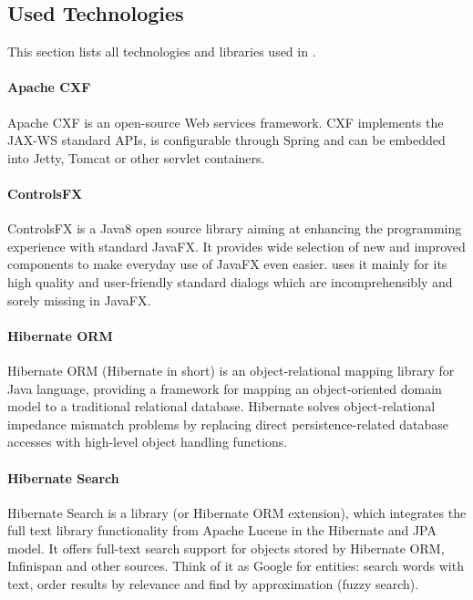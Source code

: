 
\subsection{Used Technologies}

This section lists all technologies and libraries used in \textan{}.

\paragraph{Apache CXF}
Apache CXF is an open-source Web services framework. CXF implements the JAX-WS 
standard APIs, is configurable through Spring and can be embedded into Jetty,
Tomcat or other servlet containers.

\paragraph{ControlsFX}
ControlsFX is a Java8 open source library aiming at enhancing the programming
experience with standard JavaFX. It provides wide selection of new and improved
components to make everyday use of JavaFX even easier. \textan{} uses it mainly for
its high quality and user-friendly standard dialogs which are incomprehensibly
and sorely missing in JavaFX.

\paragraph{Hibernate ORM}
Hibernate ORM (Hibernate in short) is an object-relational mapping library for
Java language, providing a framework for mapping an object-oriented domain
model to a traditional relational database. Hibernate solves object-relational
impedance mismatch problems by replacing direct persistence-related database
accesses with high-level object handling functions.

\paragraph{Hibernate Search}
Hibernate Search is a library (or Hibernate ORM extension), which integrates
the full text library functionality from Apache Lucene in the Hibernate and
JPA model. It offers full-text search support for objects stored by Hibernate
ORM, Infinispan and other sources. Think of it as Google\texttrademark{} for
entities: search words with text, order results by relevance and find by
approximation (fuzzy search).

